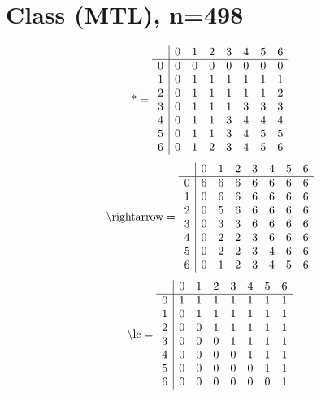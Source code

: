 \documentclass[11pt]{article}
\begin{document}
\section{Class (MTL), n=498}
\[\text{*} = 
\begin{array}{r | r r r r r r r}
 & 0 & 1 & 2 & 3 & 4 & 5 & 6 \\ \hline
0 & 0 & 0 & 0 & 0 & 0 & 0 & 0 \\
1 & 0 & 1 & 1 & 1 & 1 & 1 & 1 \\
2 & 0 & 1 & 1 & 1 & 1 & 1 & 2 \\
3 & 0 & 1 & 1 & 1 & 3 & 3 & 3 \\
4 & 0 & 1 & 1 & 3 & 4 & 4 & 4 \\
5 & 0 & 1 & 1 & 3 & 4 & 5 & 5 \\
6 & 0 & 1 & 2 & 3 & 4 & 5 & 6 \\
\end{array}
\]
\[\text{\textbackslash rightarrow} = 
\begin{array}{r | r r r r r r r}
 & 0 & 1 & 2 & 3 & 4 & 5 & 6 \\ \hline
0 & 6 & 6 & 6 & 6 & 6 & 6 & 6 \\
1 & 0 & 6 & 6 & 6 & 6 & 6 & 6 \\
2 & 0 & 5 & 6 & 6 & 6 & 6 & 6 \\
3 & 0 & 3 & 3 & 6 & 6 & 6 & 6 \\
4 & 0 & 2 & 2 & 3 & 6 & 6 & 6 \\
5 & 0 & 2 & 2 & 3 & 4 & 6 & 6 \\
6 & 0 & 1 & 2 & 3 & 4 & 5 & 6 \\
\end{array}
\]
\[\text{\textbackslash le} = 
\begin{array}{r | r r r r r r r}
 & 0 & 1 & 2 & 3 & 4 & 5 & 6 \\ \hline
0 & 1 & 1 & 1 & 1 & 1 & 1 & 1 \\
1 & 0 & 1 & 1 & 1 & 1 & 1 & 1 \\
2 & 0 & 0 & 1 & 1 & 1 & 1 & 1 \\
3 & 0 & 0 & 0 & 1 & 1 & 1 & 1 \\
4 & 0 & 0 & 0 & 0 & 1 & 1 & 1 \\
5 & 0 & 0 & 0 & 0 & 0 & 1 & 1 \\
6 & 0 & 0 & 0 & 0 & 0 & 0 & 1 \\
\end{array}
\]
\end{document}
